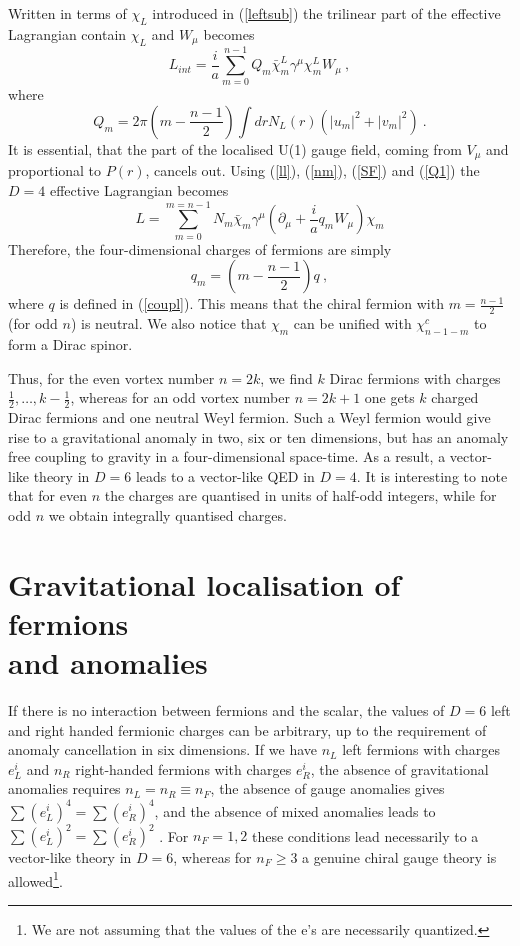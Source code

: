 \documentclass[a4paper,12pt]{article}
\begin{document}
Written in terms of $\chi_L$ introduced in (\ref{leftsub})  the
trilinear part of the effective Lagrangian contain $\chi_L$ and
$W_\mu$ becomes 
\begin{equation}
L_{int}= \frac{i}{a}\sum_{m=0}^{n-1} 
Q_m\bar\chi_m^L\gamma^\mu \chi_m^L W_\mu~,
\end{equation}
where 
\begin{equation}
Q_m = 2 \pi \left(m-\frac{n-1}{2}\right)\int dr N_L(r)
\left(|u_m|^2+ |v_m|^2 \right)~.
\end{equation}
It is essential, that the part of the localised U(1) gauge field,
coming from $V_\mu$ and proportional to $P(r)$, cancels out. Using
(\ref{ll}), (\ref{nm}), (\ref{SF}) and (\ref{Q1}) 
the $D=4$ effective Lagrangian becomes
\begin{equation}
L= \sum_{m=0} ^{m=n-1} N_m \bar\chi_m \gamma^\mu (\partial_\mu +
\frac{i}{a} q_m W_\mu)\chi_m
\end{equation}
 Therefore, the four-dimensional charges of fermions are simply
\begin{equation}
q_m= \left(m-\frac{n-1}{2}\right)q~,
\end{equation}
where $q$ is defined in (\ref{coupl}). This means that the chiral
fermion with $m=\frac{n-1}{2}$ (for odd $n$) is neutral. We also
notice that $\chi_m$ can be unified with $\chi_{n-1-m}^c$ to form a
Dirac spinor.

Thus, for the even vortex number $n=2k$, we find $k$ Dirac fermions
with charges $\frac{1}{2},\dots, k-\frac{1}{2}$, whereas for an odd
vortex number $n=2k+1$ one gets $k$ charged Dirac fermions and one
neutral Weyl fermion. Such a  Weyl fermion would give rise to a
gravitational anomaly in two, six or ten dimensions, but has an
anomaly free coupling to gravity in a four-dimensional space-time. As
a result, a vector-like theory in $D=6$ leads to a vector-like QED in
$D=4$. It is interesting to note that for even $n$ the charges are
quantised in units of half-odd integers, while for odd $n$ we obtain
integrally quantised charges.
\section{Gravitational localisation of fermions\\ and anomalies}
If there is no interaction between fermions and the scalar,  the
values of $D=6$ left and right handed  fermionic charges can be
arbitrary, up to the requirement of anomaly cancellation in six
dimensions. If we have $n_L$ left fermions with charges $e_L^i$ and
$n_R$ right-handed fermions with charges $e_R^i$, the absence of
gravitational anomalies requires $n_L =n_R \equiv n_F$, the absence
of gauge anomalies gives $\sum (e_L^i)^4= \sum (e_R^i)^4$, and the
absence of mixed anomalies leads to $\sum (e_L^i)^2= \sum (e_R^i)^2$
\cite{Alvarez-Gaume:1983ig}. For $n_F=1,2$ these conditions lead
necessarily to a vector-like theory in $D=6$, whereas for $n_F\geq 3$
a genuine chiral gauge theory is allowed\footnote{We are not assuming
that the values of the e's are necessarily quantized.}.
\end{document}
